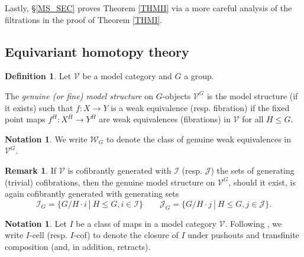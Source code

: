 \documentclass[a4paper,10pt
,draft
]{article}%
\numberwithin{equation}{section}
\numberwithin{figure}{section}
\theoremstyle{definition} %
\newtheorem{definition}[equation]{Definition}%
\newtheorem{remark}[equation]{Remark}%
\newtheorem{notation}[equation]{Notation}%
\newcommand{\V}{\ensuremath{\mathcal V}}
\newcommand{\1}{\ensuremath{\mathbbm 1}}%
\begin{document}
Lastly, \S \ref{MS_SEC} proves 
Theorem \ref{THMII} via a more careful analysis
of the filtrations in the proof of Theorem \ref{THMI}.





\subsection{Equivariant homotopy theory}
\label{EHT_SEC}



\begin{definition}\label{GENMOD DEF}
Let $\V$ be a model category and $G$ a group.

The \emph{genuine (or fine) model structure} on $G$-objects $\V^G$
is the model structure (if it exists)
such that
$f\colon X \to Y$
is a weak equivalence (resp. fibration)
if the fixed point maps
$f^H\colon X^H \to Y^H$
are weak equivalences (fibrations) in $\V$
for all $H \leq G$.
\end{definition}


\begin{notation}
We write $\mathcal{W}_G$
to denote the class of genuine weak equivalences in $\V^G$.
\end{notation}


\begin{remark}
If $\V$ is cofibrantly generated with 
$\mathcal{I}$ (resp. $\mathcal{J}$)
the sets of generating (trivial) cofibrations,
then the genuine model structure on $\V^G$,
should it exist,
is again cofibrantly generated with generating sets
\begin{equation}\label{GENGENSETEQ}
	\mathcal{I}_G = \{G/H \cdot i \ | \ H\leq G,i\in \mathcal{I}\}
\qquad
	\mathcal{J}_G = \{G/H \cdot j \ | \ H\leq G,j\in \mathcal{J}\}.
\end{equation}
\end{remark}



\begin{notation}
      \label{CELL_NOT}
Let $I$ be a class of maps in a model category $\V$.
Following \cite{Hov99}, we write 
$I$-cell (resp. $I$-cof)
to denote the closure of $I$ under pushouts and transfinite composition
(and, in addition, retracts).
\end{notation}
\end{document}
